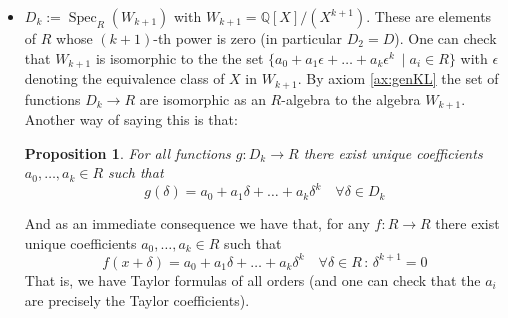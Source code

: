 \documentclass[11pt]{article}
\newtheorem{proposition}{Proposition}[section]
\theoremstyle{definition}
\DeclareMathOperator{\spec}{Spec}
\numberwithin{equation}{section}
\begin{document}
\begin{itemize}
  \item \( D_k := \spec_R(W_{k+1}) \) with \( W_{k+1} = \mathbb{Q}[X]/(X^{k+1}) \). These are elements of \( R \) whose \( (k+1) \)-th power is zero (in particular \( D_2 = D \)). One can check that \( W_{k+1} \) is isomorphic to the the set \( \{a_0+a_1\epsilon + \dots + a_k\epsilon^k\ \mid a_i\in R\} \) with \( \epsilon \) denoting the equivalence class of \( X \) in \( W_{k+1} \). By axiom \ref{ax:genKL} the set of functions \( D_k\to R \) are isomorphic as an \( R \)-algebra to the algebra \( W_{k+1} \). Another way of saying this is that:
    \begin{proposition}
      For all functions \( g:D_k\to R \) there exist unique coefficients \( a_0,\dots,a_k\in R \) such that
      \begin{equation*}
	 g(\delta) = a_0 + a_1\delta + \dots + a_k\delta^k \quad \forall\delta\in D_k
      \end{equation*}
    \end{proposition}
    And as an immediate consequence we have that, for any \( f:R\to R \) there exist unique coefficients \( a_0,\dots,a_k\in R \) such that
    \begin{equation*}
      f(x+\delta) = a_0 + a_1\delta + \dots + a_k\delta^k \quad \forall \delta\in R\, :\, \delta^{k+1}=0
    \end{equation*}
    That is, we have Taylor formulas of all orders (and one can check that the \( a_i \) are precisely the Taylor coefficients).


\end{itemize}
\end{document}
